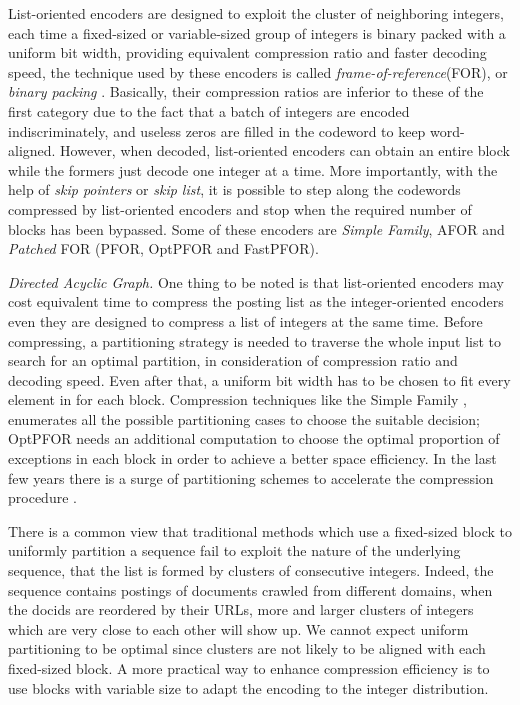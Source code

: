 \documentclass[runningheads]{comsis2}
\begin{document}
List-oriented encoders are designed to exploit the cluster of neighboring integers, each time a fixed-sized or variable-sized group of integers is binary packed with a uniform bit width, providing equivalent compression ratio and faster decoding speed, the technique used by these encoders is called \textit{frame-of-reference}(FOR), or \textit{binary packing} \cite{goldstein1998compressing}.
Basically, their compression ratios are inferior to these of the first category due to the fact that a batch of integers are encoded indiscriminately, and useless zeros are filled in the codeword to keep word-aligned.
However, when decoded, list-oriented encoders can obtain an entire block while the formers just decode one integer at a time.
More importantly, with the help of \textit{skip pointers} or \textit{skip list}, it is possible to step along the codewords compressed by list-oriented encoders and stop when the required number of blocks has been bypassed.
Some of these encoders are \textit{Simple Family}, AFOR and \textit{Patched} FOR (PFOR, OptPFOR and FastPFOR).

\textit{Directed Acyclic Graph.}
One thing to be noted is that list-oriented encoders may cost equivalent time to compress the posting list as the integer-oriented encoders even they are designed to compress a list of integers at the same time.
Before compressing, a partitioning strategy is needed to traverse the whole input list to search for an optimal partition, in consideration of compression ratio and decoding speed.
Even after that, a uniform bit width has to be chosen to fit every element in for each block.
Compression techniques like the Simple Family \cite{anh2005inverted,anh2010index}, enumerates all the possible partitioning cases to choose the suitable decision; OptPFOR \cite{yan2009inverted} needs an additional computation to choose the optimal proportion of exceptions in each block in order to achieve a better space efficiency.
In the last few years there is a surge of partitioning schemes to accelerate the compression procedure \cite{lemire2015decoding,ottaviano2014partitioned,zhao2015general}.

There is a common view that traditional methods which use a fixed-sized block to uniformly partition a sequence fail to exploit the nature of the underlying sequence, that the list is formed by clusters of consecutive integers.
Indeed, the sequence contains postings of documents crawled from different domains, when the docids are reordered by their URLs, more and larger clusters of integers which are very close to each other will show up.
We cannot expect uniform partitioning to be optimal since clusters are not likely to be aligned with each fixed-sized block.
A more practical way to enhance compression efficiency is to use blocks with variable size to adapt the encoding to the integer distribution.
\end{document}

